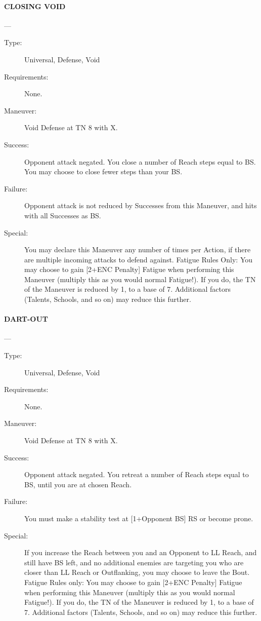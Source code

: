 \documentclass[oneside,11pt,english]{book}
\begin{document}
\paragraph{\large\label{man:CLOSING VOID} CLOSING VOID}---\quad{\large[X]}
\vspace{-10pt}\begin{description} 
\item [Type:] Universal, Defense, Void 
\item [Requirements:] None. 
\item [Maneuver:] Void Defense at TN 8 with X. 
\item [Success:] Opponent attack negated. You close a number of Reach steps equal to BS. You may choose to 
close fewer steps than your BS. 
\item [Failure:] Opponent attack is not reduced by Successes from this Maneuver, and hits with all Successes as 
BS. 
\item [Special:] You may declare this Maneuver any number of times per Action, if there are multiple incoming 
attacks to defend against. 
Fatigue Rules Only: You may choose to gain [2+ENC Penalty] Fatigue when performing this Maneuver 
(multiply this as you would normal Fatigue!). If you do, the TN of the Maneuver is reduced by 1, to a 
base of 7. Additional factors (Talents, Schools, and so on) may reduce this further. 
\end{description}
\paragraph{\large\label{man:DART-OUT} DART-OUT}---
\vspace{-10pt}\begin{description} 
\item [Type:] Universal, Defense, Void 
\item [Requirements:] None. 
\item [Maneuver:] Void Defense at TN 8 with X. 
\item [Success:] Opponent attack negated. You retreat a number of Reach steps equal to BS, until you are at 
chosen Reach. 
\item [Failure:] You must make a stability test at [1+Opponent BS] RS or become prone. 
\item [Special:] If you increase the Reach between you and an Opponent to LL Reach, and still have BS left, and 
no additional enemies are targeting you who are closer than LL Reach or Outflanking, you may choose to 
leave the Bout. 
Fatigue Rules only: You may choose to gain [2+ENC Penalty] Fatigue when performing this Maneuver 
(multiply this as you would normal Fatigue!). If you do, the TN of the Maneuver is reduced by 1, to a 
base of 7. Additional factors (Talents, Schools, and so on) may reduce this further. 
\end{description}
\end{document}
